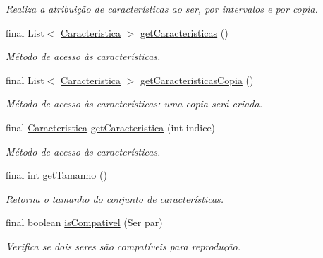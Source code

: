 \begin{DoxyCompactItemize}
\begin{DoxyCompactList}\small\item\em Realiza a atribuição de características ao ser, por intervalos e por copia. \end{DoxyCompactList}\item 
final List$<$ \hyperlink{interfaceic_1_1populacional_1_1_caracteristica}{Caracteristica} $>$ \hyperlink{classic_1_1populacional_1_1_ser_3_01_g_01extends_01_number_01_4_a1145bd3db9f8e32b34eff3904970fd59}{get\-Caracteristicas} ()
\begin{DoxyCompactList}\small\item\em Método de acesso às características. \end{DoxyCompactList}\item 
final List$<$ \hyperlink{interfaceic_1_1populacional_1_1_caracteristica}{Caracteristica} $>$ \hyperlink{classic_1_1populacional_1_1_ser_3_01_g_01extends_01_number_01_4_a3ad67ae7142f1b2bc03b3395ae7f6a48}{get\-Caracteristicas\-Copia} ()
\begin{DoxyCompactList}\small\item\em Método de acesso às características\-: uma copia será criada. \end{DoxyCompactList}\item 
final \hyperlink{interfaceic_1_1populacional_1_1_caracteristica}{Caracteristica} \hyperlink{classic_1_1populacional_1_1_ser_3_01_g_01extends_01_number_01_4_ae4a4fdd8f0b504f93fb8ed6fb42a5f27}{get\-Caracteristica} (int indice)
\begin{DoxyCompactList}\small\item\em Método de acesso às características. \end{DoxyCompactList}\item 
final int \hyperlink{classic_1_1populacional_1_1_ser_3_01_g_01extends_01_number_01_4_aa306c92b51787c683362954d752cf924}{get\-Tamanho} ()
\begin{DoxyCompactList}\small\item\em Retorna o tamanho do conjunto de características. \end{DoxyCompactList}\item 
final boolean \hyperlink{classic_1_1populacional_1_1_ser_3_01_g_01extends_01_number_01_4_aad856d4f5cfc1afee034166be3e0737c}{is\-Compativel} (Ser par)
\begin{DoxyCompactList}\small\item\em Verifica se dois seres são compatíveis para reprodução. \end{DoxyCompactList}\item 

\end{DoxyCompactItemize}
